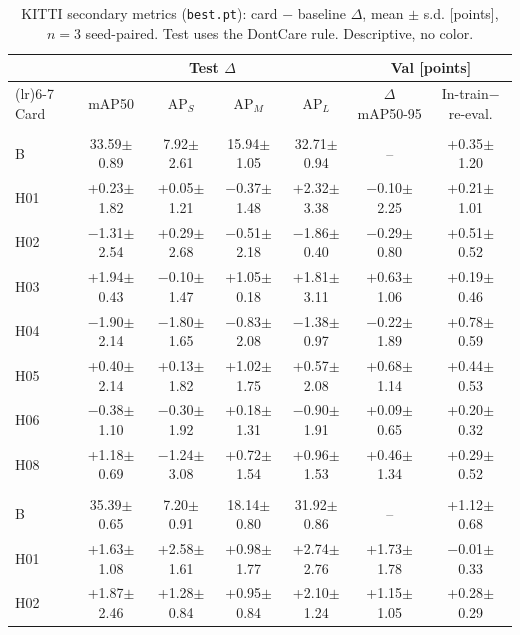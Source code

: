 \begin{table}[!htbp]
\centering\small\setlength{\tabcolsep}{3pt}
\caption{KITTI secondary metrics (\texttt{best.pt}): card $-$ baseline $\Delta$, mean $\pm$ s.d. [points], $n=3$ seed-paired. Test uses the DontCare rule. Descriptive, no color.}\label{tab:kitti-test-ek}
\begin{tabularx}{\textwidth}{>{\raggedright\arraybackslash}X c c c c c c}
\toprule
\multicolumn{1}{@{}l}{} & \multicolumn{4}{c}{Test $\Delta$} & \multicolumn{2}{c}{Val [points]} \\
\cmidrule(lr){2-5}\cmidrule(lr){6-7}
Card & mAP50 & AP$_S$ & AP$_M$ & AP$_L$ & $\Delta$ mAP50-95 & In-train$-$re-eval. \\
\midrule
\multicolumn{7}{@{}l}{\textbf{YOLO26n}} \\
B & 33.59$\pm$0.89 & 7.92$\pm$2.61 & 15.94$\pm$1.05 & 32.71$\pm$0.94 & -- & +0.35$\pm$1.20 \\
H01 & +0.23$\pm$1.82 & +0.05$\pm$1.21 & $-$0.37$\pm$1.48 & +2.32$\pm$3.38 & $-$0.10$\pm$2.25 & +0.21$\pm$1.01 \\
H02 & $-$1.31$\pm$2.54 & +0.29$\pm$2.68 & $-$0.51$\pm$2.18 & $-$1.86$\pm$0.40 & $-$0.29$\pm$0.80 & +0.51$\pm$0.52 \\
H03 & +1.94$\pm$0.43 & $-$0.10$\pm$1.47 & +1.05$\pm$0.18 & +1.81$\pm$3.11 & +0.63$\pm$1.06 & +0.19$\pm$0.46 \\
H04 & $-$1.90$\pm$2.14 & $-$1.80$\pm$1.65 & $-$0.83$\pm$2.08 & $-$1.38$\pm$0.97 & $-$0.22$\pm$1.89 & +0.78$\pm$0.59 \\
H05 & +0.40$\pm$2.14 & +0.13$\pm$1.82 & +1.02$\pm$1.75 & +0.57$\pm$2.08 & +0.68$\pm$1.14 & +0.44$\pm$0.53 \\
H06 & $-$0.38$\pm$1.10 & $-$0.30$\pm$1.92 & +0.18$\pm$1.31 & $-$0.90$\pm$1.91 & +0.09$\pm$0.65 & +0.20$\pm$0.32 \\
H08 & +1.18$\pm$0.69 & $-$1.24$\pm$3.08 & +0.72$\pm$1.54 & +0.96$\pm$1.53 & +0.46$\pm$1.34 & +0.29$\pm$0.52 \\
\midrule
\multicolumn{7}{@{}l}{\textbf{YOLO11s}} \\
B & 35.39$\pm$0.65 & 7.20$\pm$0.91 & 18.14$\pm$0.80 & 31.92$\pm$0.86 & -- & +1.12$\pm$0.68 \\
H01 & +1.63$\pm$1.08 & +2.58$\pm$1.61 & +0.98$\pm$1.77 & +2.74$\pm$2.76 & +1.73$\pm$1.78 & $-$0.01$\pm$0.33 \\
H02 & +1.87$\pm$2.46 & +1.28$\pm$0.84 & +0.95$\pm$0.84 & +2.10$\pm$1.24 & +1.15$\pm$1.05 & +0.28$\pm$0.29 \\

\end{tabularx}
\end{table}
